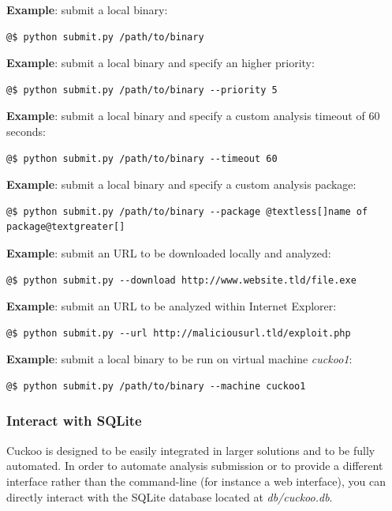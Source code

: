 \documentclass[letterpaper,10pt,english]{sphinxmanual}
\begin{document}
\textbf{Example}: submit a local binary:

\begin{Verbatim}[commandchars=@\[\]]
@$ python submit.py /path/to/binary
\end{Verbatim}

\textbf{Example}: submit a local binary and specify an higher priority:

\begin{Verbatim}[commandchars=@\[\]]
@$ python submit.py /path/to/binary --priority 5
\end{Verbatim}

\textbf{Example}: submit a local binary and specify a custom analysis timeout of
60 seconds:

\begin{Verbatim}[commandchars=@\[\]]
@$ python submit.py /path/to/binary --timeout 60
\end{Verbatim}

\textbf{Example}: submit a local binary and specify a custom analysis package:

\begin{Verbatim}[commandchars=@\[\]]
@$ python submit.py /path/to/binary --package @textless[]name of package@textgreater[]
\end{Verbatim}

\textbf{Example}: submit an URL to be downloaded locally and analyzed:

\begin{Verbatim}[commandchars=@\[\]]
@$ python submit.py --download http://www.website.tld/file.exe
\end{Verbatim}

\textbf{Example}: submit an URL to be analyzed within Internet Explorer:

\begin{Verbatim}[commandchars=@\[\]]
@$ python submit.py --url http://maliciousurl.tld/exploit.php
\end{Verbatim}

\textbf{Example}: submit a local binary to be run on virtual machine \emph{cuckoo1}:

\begin{Verbatim}[commandchars=@\[\]]
@$ python submit.py /path/to/binary --machine cuckoo1
\end{Verbatim}


\subsubsection{Interact with SQLite}
\label{usage/submit:interact-with-sqlite}
Cuckoo is designed to be easily integrated in larger solutions and to be fully
automated. In order to automate analysis submission or to provide a different
interface rather than the command-line (for instance a web interface), you can
directly interact with the SQLite database located at \emph{db/cuckoo.db}.
\end{document}
